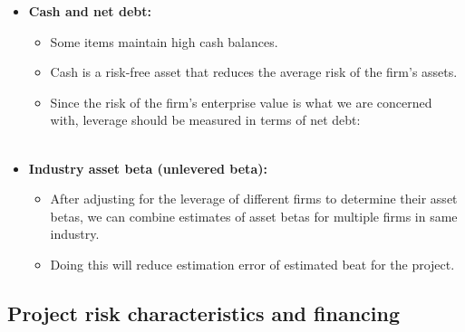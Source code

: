 \documentclass[ieeetran]{article}
\begin{document}
\begin{itemize}
\item \textbf{Cash and net debt:}
	\begin{itemize}
	  \item Some items maintain high cash balances.
	\item Cash is a risk-free asset that reduces the average risk of the firm's assets.
	\item Since the risk of the firm's enterprise value is what we are concerned with, leverage should be measured in terms of net debt: \\ \\
		\large
  \end{itemize}

\item \textbf{Industry asset beta (unlevered beta):}
	\begin{itemize}
	  \item After adjusting for the leverage of different firms to determine their asset betas, we can combine estimates of asset betas for multiple firms in same industry.
		  \item Doing this will reduce estimation error of estimated beat for the project.
	\end{itemize}
\end{itemize}

\subsection{Project risk characteristics and financing} %
\label{sub:project_risk_characteristics_and_financing}
\end{document}
